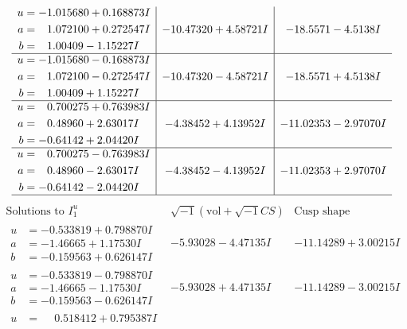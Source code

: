 \documentclass[1p]{elsarticle_modified}
\theoremstyle{definition}
\newcommand{\I}{\sqrt{-1}}
\begin{document}
$$\begin{array}{c|c|c}
\begin{aligned}
u &= -1.015680 + 0.168873 I \\
a &= \phantom{-}1.072100 + 0.272547 I \\
b &= \phantom{-}1.00409 - 1.15227 I\end{aligned}
 & -10.47320 + 4.58721 I & -18.5571 - 4.5138 I \\ \hline\begin{aligned}
u &= -1.015680 - 0.168873 I \\
a &= \phantom{-}1.072100 - 0.272547 I \\
b &= \phantom{-}1.00409 + 1.15227 I\end{aligned}
 & -10.47320 - 4.58721 I & -18.5571 + 4.5138 I \\ \hline\begin{aligned}
u &= \phantom{-}0.700275 + 0.763983 I \\
a &= \phantom{-}0.48960 + 2.63017 I \\
b &= -0.64142 + 2.04420 I\end{aligned}
 & -4.38452 + 4.13952 I & -11.02353 - 2.97070 I \\ \hline\begin{aligned}
u &= \phantom{-}0.700275 - 0.763983 I \\
a &= \phantom{-}0.48960 - 2.63017 I \\
b &= -0.64142 - 2.04420 I\end{aligned}
 & -4.38452 - 4.13952 I & -11.02353 + 2.97070 I\\
 \hline 
 \end{array}$$\newpage$$\begin{array}{c|c|c}  
\text{Solutions to }I^u_{1}& \I (\text{vol} + \sqrt{-1}CS) & \text{Cusp shape}\\
 \hline 
\begin{aligned}
u &= -0.533819 + 0.798870 I \\
a &= -1.46665 + 1.17530 I \\
b &= -0.159563 + 0.626147 I\end{aligned}
 & -5.93028 - 4.47135 I & -11.14289 + 3.00215 I \\ \hline\begin{aligned}
u &= -0.533819 - 0.798870 I \\
a &= -1.46665 - 1.17530 I \\
b &= -0.159563 - 0.626147 I\end{aligned}
 & -5.93028 + 4.47135 I & -11.14289 - 3.00215 I \\ \hline\begin{aligned}
u &= \phantom{-}0.518412 + 0.795387 I \\

\end{aligned}
\end{array}$$
\end{document}

